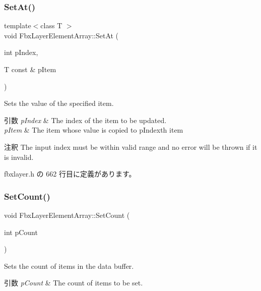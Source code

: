 \subsubsection{\texorpdfstring{Set\+At()}{SetAt()}\hspace{0.1cm}{\footnotesize\ttfamily [2/2]}}
{\footnotesize\ttfamily template$<$class T $>$ \\
void Fbx\+Layer\+Element\+Array\+::\+Set\+At (\begin{DoxyParamCaption}\item[{int}]{p\+Index,  }\item[{T const \&}]{p\+Item }\end{DoxyParamCaption})\hspace{0.3cm}{\ttfamily [inline]}}

Sets the value of the specified item. 
\begin{DoxyParams}{引数}
{\em p\+Index} & The index of the item to be updated. \\
\hline
{\em p\+Item} & The item whose value is copied to p\+Index\textquotesingle{}th item \\
\hline
\end{DoxyParams}
\begin{DoxyRemark}{注釈}
The input index must be within valid range and no error will be thrown if it is invalid. 
\end{DoxyRemark}


 fbxlayer.\+h の 662 行目に定義があります。

\mbox{\label{class_fbx_layer_element_array_a3a8d1c285bb30e8d0dfdf71f819fa57b}} 
\subsubsection{\texorpdfstring{Set\+Count()}{SetCount()}}
{\footnotesize\ttfamily void Fbx\+Layer\+Element\+Array\+::\+Set\+Count (\begin{DoxyParamCaption}\item[{int}]{p\+Count }\end{DoxyParamCaption})}

Sets the count of items in the data buffer. 
\begin{DoxyParams}{引数}
{\em p\+Count} & The count of items to be set. \\
\hline
\end{DoxyParams}
\mbox{\label{class_fbx_layer_element_array_aa031d26b76ef7871ac0d35a8dff6462a}} 
